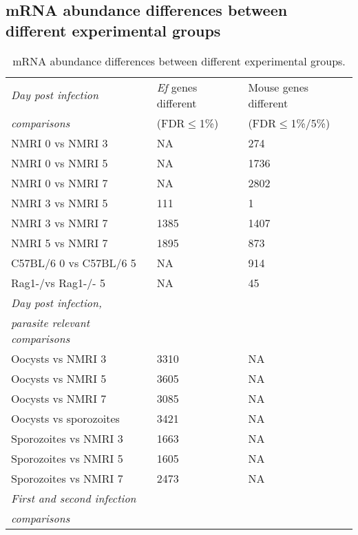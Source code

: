 \documentclass{bmcart}
\begin{document}
\begin{backmatter}

\clearpage
\section{mRNA abundance differences between different experimental groups}
\setlength{\tabcolsep}{8pt}
\begin{table}[H]
\small
\begin{center}
\caption{mRNA abundance differences between different experimental groups.}
\begin{tabular}{*3l}    \toprule
\textit{Day post infection} & \textit{Ef} genes different & Mouse genes different \\ 
	\textit{comparisons} 	    & (FDR$\leq$1\%) &  (FDR$\leq$1\%/5\%) \\ \midrule
	NMRI 0 vs NMRI 3		& NA   & 274 \\
	NMRI 0 vs NMRI 5		& NA   & 1736 \\
	NMRI 0 vs NMRI 7		& NA   & 2802 \\
	NMRI 3 vs NMRI 5     		& 111  & 1 \\
	NMRI 3 vs NMRI 7  		& 1385 & 1407 \\ 
	NMRI 5 vs NMRI 7  		& 1895 & 873 \\ 
	C57BL/6 0 vs C57BL/6 5		& NA	& 914 \\
	Rag1-/vs Rag1-/- 5		& NA	& 45 \\ \midrule
\textit{Day post infection,} & 		 & 		 \\ 
\textit{parasite relevant comparisons} 	    & 		&  \\ \midrule
	Oocysts vs NMRI 3  	& 3310 & NA \\  
	Oocysts vs NMRI 5	& 3605 & NA \\ 
	Oocysts vs NMRI 7	& 3085 & NA \\ 
	Oocysts vs sporozoites  & 3421 & NA \\
	Sporozoites vs NMRI 3 	& 1663 & NA \\
	Sporozoites vs NMRI 5 	& 1605 & NA \\
	Sporozoites vs NMRI 7 	& 2473 & NA \\ \midrule
\textit{First and second infection} & 		 & 	 \\ 
\textit{comparisons} 	    & 		& 	\\ \midrule

\end{tabular}
\end{center}
\end{table}
\end{backmatter}
\end{document}
